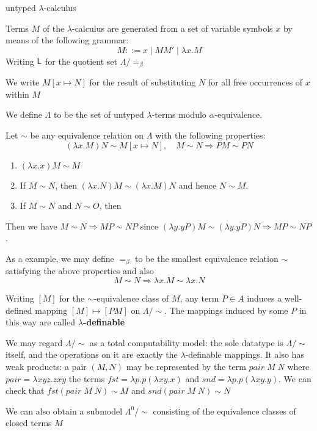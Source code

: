 \documentclass[11pt]{article}
\begin{document}
\begin{examplle}[]
\label{3.1.6}
untyped \(\lambda\)-calculus

Terms \(M\) of the \(\lambda\)-calculus are generated from a set of variable symbols \(x\) by means of the following
grammar:
\begin{equation*}
M::=x\mid MM'\mid\lambda x.M
\end{equation*}
Writing \(\textsf{L}\) for the quotient set \(\Lambda/=_\beta\)

We write \(M[x\mapsto N]\) for the result of substituting \(N\) for all free occurrences of \(x\)
within \(M\)

We define \(\Lambda\)  to be the set of untyped \(\lambda\)-terms modulo \(\alpha\)-equivalence.

Let \(\sim\) be any equivalence relation on \(\Lambda\) with the following properties:
\begin{equation*}
(\lambda x.M)N\sim M[x\mapsto N],\quad M\sim N\Rightarrow PM\sim PN
\end{equation*}
\begin{enumerate}
\item \((\lambda x.x)M\sim M\)
\item If \(M\sim N\), then \((\lambda x.N)M\sim(\lambda x.M)N\) and hence \(N\sim M\).
\item If \(M\sim N\) and \(N\sim O\), then
\end{enumerate}

Then we have \(M\sim N\Rightarrow MP\sim NP\) since \((\lambda y.yP)M\sim(\lambda y.yP)N\Rightarrow MP\sim NP\).

As a example, we may define \(=_\beta\) to be the smallest equivalence relation \(\sim\) satisfying the
above properties and also
\begin{equation*}
M\sim N\Rightarrow \lambda x.M\sim\lambda x.N
\end{equation*}

Writing \([M]\) for the \(\sim\)-equivalence class of \(M\), any term \(P\in A\) induces a
well-defined mapping \([M]\mapsto[PM]\) on \(\Lambda/\sim\). The mappings induced by some \(P\) in this way are
called \textbf{\(\lambda\)-definable}

We may regard \(\Lambda/\sim\) as a total computability model: the sole datatype is \(\Lambda/\sim\) itself, and
the operations on it are exactly the \(\lambda\)-definable mappings. It also has weak products: a
pair \((M,N)\) may be represented by the term \(pair\;M\;N\) where \(pair=\lambda xyz.zxy\)
the terms \(fst=\lambda p.p(\lambda xy.x)\) and \(snd=\lambda p.p(\lambda xy.y)\). We can check that
\(fst(pair\; M\;N)\sim M\) and \(snd(pair\;M\;N)\sim N\)

We can also obtain a submodel \(\Lambda^0/\sim\) consisting of the equivalence classes of closed terms \(M\)
\end{examplle}
\end{document}
